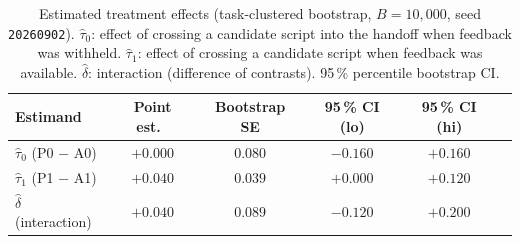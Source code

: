 \begin{table}[ht]
\centering
\caption{Estimated treatment effects (task-clustered bootstrap, $B=10{,}000$, seed \texttt{20260902}).
  $\hat\tau_0$: effect of crossing a candidate script into the handoff when feedback was withheld.
  $\hat\tau_1$: effect of crossing a candidate script when feedback was available.
  $\hat\delta$: interaction (difference of contrasts).
  95\,\% percentile bootstrap CI.}
\label{tab:effects}
\begin{tabular}{lccccc}
\toprule
Estimand & Point est.\ & Bootstrap SE & 95\,\% CI (lo) & 95\,\% CI (hi) \\
\midrule
  $\hat\tau_0$ (P0 $-$ A0) & $+0.000$ & $0.080$ & $-0.160$ & $+0.160$ \\
  $\hat\tau_1$ (P1 $-$ A1) & $+0.040$ & $0.039$ & $+0.000$ & $+0.120$ \\
  $\hat\delta$ (interaction) & $+0.040$ & $0.089$ & $-0.120$ & $+0.200$ \\
\bottomrule
\end{tabular}
\end{table}
